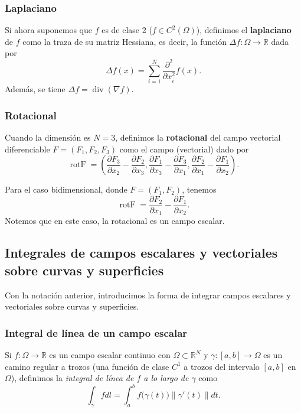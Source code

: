 \documentclass[12pt,spanish]{article}
\theoremstyle{definition}
\theoremstyle{remark}
\begin{document}
\subsubsection*{Laplaciano}

Si ahora suponemos que $f$ es de clase 2 ($f\in C^2(\Omega)$), definimos el \textbf{laplaciano} de $f$ como la traza de su matriz Hessiana, es decir, la función $\Delta f:\Omega\rightarrow\mathbb{R}$ dada por
\[\Delta f(x)=\sum_{i=1}^{N}\frac{\partial^2}{\partial x_i^2}f(x).\]
Además, se tiene $\Delta f=\operatorname{div}(\nabla f)$.

\subsubsection*{Rotacional}

Cuando la dimensión es $N=3$, definimos la \textbf{rotacional} del campo vectorial diferenciable $F=(F_1,F_2,F_3)$ como el campo (vectorial) dado por
\[\operatorname{rot F}=\left(\frac{\partial F_3}{\partial x_2}-\frac{\partial F_2}{\partial x_3},\frac{\partial F_1}{\partial x_3}-\frac{\partial F_3}{\partial x_1},\frac{\partial F_2}{\partial x_1}-\frac{\partial F_1}{\partial x_2}\right).\]

Para el caso bidimensional, donde $F=(F_1,F_2)$, tenemos
\[\operatorname{rot F}=\frac{\partial F_2}{\partial x_1}-\frac{\partial F_1}{\partial x_2}.\]
Notemos que en este caso, la rotacional es un campo escalar.

\subsection{Integrales de campos escalares y vectoriales sobre curvas y superficies}

Con la notación anterior, introducimos la forma de integrar campos escalares y vectoriales sobre curvas y superficies.

\subsubsection*{Integral de línea de un campo escalar}

Si $f:\Omega\rightarrow\mathbb{R}$ es un campo escalar continuo con $\Omega\subset\mathbb{R}^N$ y $\gamma:[a,b]\rightarrow\Omega$ es un camino regular a trozos (una función de clase $C^1$ a trozos del intervalo $[a,b]$ en $\Omega$), definimos la \emph{integral de línea de $f$ a lo largo de $\gamma$} como
	\[\int_\gamma f dl=\int_a^b f\big(\gamma(t)\big)\|\gamma'(t)\|dt.\]
	
\end{document}
